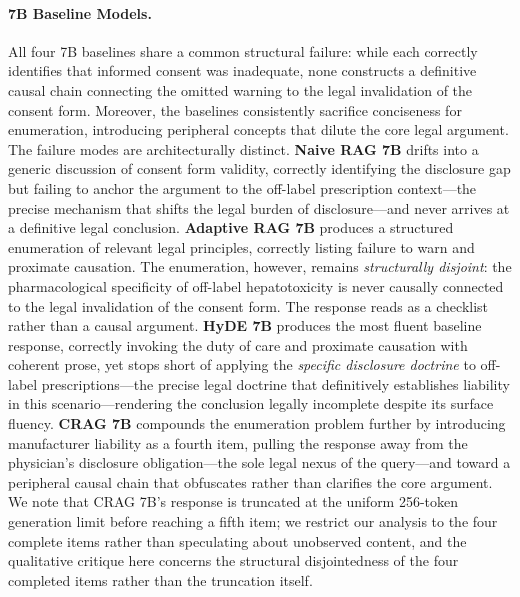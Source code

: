\documentclass[a4paper,fleql]{cas-sc}
\begin{document}
\paragraph{7B Baseline Models.}
All four 7B baselines share a common structural failure: while each correctly
identifies that informed consent was inadequate, none constructs a definitive
causal chain connecting the omitted warning to the legal invalidation of the
consent form. Moreover, the baselines consistently sacrifice conciseness for
enumeration, introducing peripheral concepts that dilute the core legal
argument. The failure modes are architecturally distinct.
\textbf{Naive RAG 7B} drifts into a generic discussion of consent form
validity, correctly identifying the disclosure gap but failing to anchor the
argument to the off-label prescription context---the precise mechanism that
shifts the legal burden of disclosure---and never arrives at a definitive legal
conclusion.
\textbf{Adaptive RAG 7B} produces a structured enumeration of relevant legal
principles, correctly listing failure to warn and proximate causation.
The enumeration, however, remains \emph{structurally disjoint}: the
pharmacological specificity of off-label hepatotoxicity is never causally
connected to the legal invalidation of the consent form. The response reads
as a checklist rather than a causal argument.
\textbf{HyDE 7B} produces the most fluent baseline response, correctly
invoking the duty of care and proximate causation with coherent prose, yet
stops short of applying the \textit{specific disclosure doctrine} to off-label
prescriptions---the precise legal doctrine that definitively establishes
liability in this scenario---rendering the conclusion legally incomplete despite
its surface fluency.
\textbf{CRAG 7B} compounds the enumeration problem further by introducing
manufacturer liability as a fourth item, pulling the response away from the
physician's disclosure obligation---the sole legal nexus of the query---and
toward a peripheral causal chain that obfuscates rather than clarifies the
core argument. We note that CRAG 7B's response is truncated at the uniform
256-token generation limit before reaching a fifth item; we restrict our
analysis to the four complete items rather than speculating about unobserved
content, and the qualitative critique here concerns the structural
disjointedness of the four completed items rather than the truncation
itself.
\end{document}
